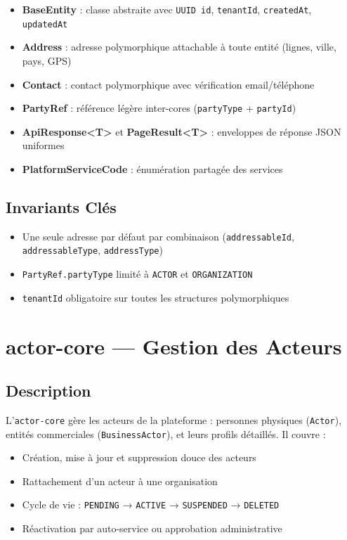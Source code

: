 \documentclass[12pt,a4paper]{report}
\begin{document}
\begin{itemize}[leftmargin=2cm]
  \item \textbf{BaseEntity} : classe abstraite avec \texttt{UUID id}, \texttt{tenantId}, \texttt{createdAt}, \texttt{updatedAt}
  \item \textbf{Address} : adresse polymorphique attachable à toute entité (lignes, ville, pays, GPS)
  \item \textbf{Contact} : contact polymorphique avec vérification email/téléphone
  \item \textbf{PartyRef} : référence légère inter-cores (\texttt{partyType} + \texttt{partyId})
  \item \textbf{ApiResponse<T>} et \textbf{PageResult<T>} : enveloppes de réponse JSON uniformes
  \item \textbf{PlatformServiceCode} : énumération partagée des services
\end{itemize}

\subsection{Invariants Clés}

\begin{itemize}[leftmargin=2cm]
  \item Une seule adresse par défaut par combinaison (\texttt{addressableId}, \texttt{addressableType}, \texttt{addressType})
  \item \texttt{PartyRef.partyType} limité à \texttt{ACTOR} et \texttt{ORGANIZATION}
  \item \texttt{tenantId} obligatoire sur toutes les structures polymorphiques
\end{itemize}

\section{actor-core — Gestion des Acteurs}

\subsection{Description}

L'\texttt{actor-core} gère les acteurs de la plateforme : personnes physiques (\texttt{Actor}), entités commerciales (\texttt{BusinessActor}), et leurs profils détaillés. Il couvre :

\begin{itemize}[leftmargin=2cm]
  \item Création, mise à jour et suppression douce des acteurs
  \item Rattachement d'un acteur à une organisation
  \item Cycle de vie : \texttt{PENDING} → \texttt{ACTIVE} → \texttt{SUSPENDED} → \texttt{DELETED}
  \item Réactivation par auto-service ou approbation administrative
\end{itemize}
\end{document}
